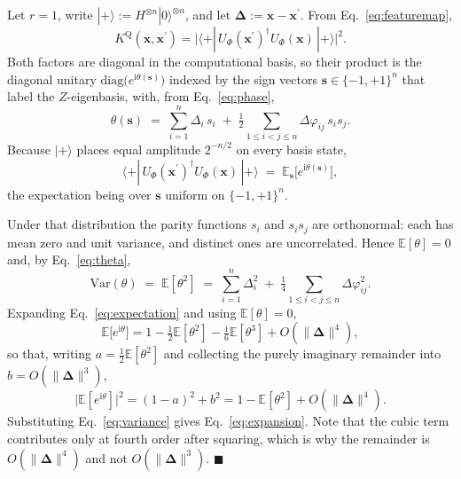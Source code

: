 \begin{revbody}
\label{app:lemma}

Let $r=1$, write $|+\rangle := H^{\otimes n}|0\rangle^{\otimes n}$, and let
$\bm{\Delta} := \bm{x}-\bm{x}^{\prime}$. From Eq.~\eqref{eq:featuremap},
\begin{equation*}
  K^{\mathrm{Q}}(\bm{x},\bm{x}^{\prime})
  = \bigl|\langle +|\,U_{\Phi}(\bm{x}^{\prime})^{\dagger}U_{\Phi}(\bm{x})\,
    |+\rangle\bigr|^{2}.
\end{equation*}
Both factors are diagonal in the computational basis, so their product is the
diagonal unitary $\mathrm{diag}\bigl(e^{\mathrm{i}\theta(\bm{s})}\bigr)$ indexed
by the sign vectors $\bm{s}\in\{-1,+1\}^{n}$ that label the $Z$-eigenbasis, with,
from Eq.~\eqref{eq:phase},
\begin{equation}
\label{eq:theta}
  \theta(\bm{s}) \;=\; \sum_{i=1}^{n}\Delta_i\,s_i
  \;+\; \tfrac{1}{2}\!\!\sum_{1\le i<j\le n}\!\!\Delta\varphi_{ij}\,s_is_j .
\end{equation}
Because $|+\rangle$ places equal amplitude $2^{-n/2}$ on every basis state,
\begin{equation}
\label{eq:expectation}
  \langle +|\,U_{\Phi}(\bm{x}^{\prime})^{\dagger}U_{\Phi}(\bm{x})\,|+\rangle
  \;=\; \mathbb{E}_{\bm{s}}\bigl[e^{\mathrm{i}\theta(\bm{s})}\bigr],
\end{equation}
the expectation being over $\bm{s}$ uniform on $\{-1,+1\}^{n}$.

Under that distribution the parity functions $s_i$ and $s_is_j$ are orthonormal:
each has mean zero and unit variance, and distinct ones are uncorrelated. Hence
$\mathbb{E}[\theta]=0$ and, by Eq.~\eqref{eq:theta},
\begin{equation}
\label{eq:variance}
  \mathrm{Var}(\theta) \;=\; \mathbb{E}[\theta^{2}]
  \;=\; \sum_{i=1}^{n}\Delta_i^{2}
  \;+\; \tfrac{1}{4}\!\!\sum_{1\le i<j\le n}\!\!\Delta\varphi_{ij}^{2}.
\end{equation}
Expanding Eq.~\eqref{eq:expectation} and using $\mathbb{E}[\theta]=0$,
\begin{equation*}
  \mathbb{E}\bigl[e^{\mathrm{i}\theta}\bigr]
  = 1 - \tfrac{1}{2}\mathbb{E}[\theta^{2}]
    - \tfrac{\mathrm{i}}{6}\mathbb{E}[\theta^{3}] + O(\|\bm{\Delta}\|^{4}),
\end{equation*}
so that, writing $a=\tfrac{1}{2}\mathbb{E}[\theta^{2}]$ and collecting the purely
imaginary remainder into $b=O(\|\bm{\Delta}\|^{3})$,
\begin{equation*}
  \bigl|\mathbb{E}[e^{\mathrm{i}\theta}]\bigr|^{2}
  = (1-a)^{2}+b^{2}
  = 1 - \mathbb{E}[\theta^{2}] + O(\|\bm{\Delta}\|^{4}).
\end{equation*}
Substituting Eq.~\eqref{eq:variance} gives Eq.~\eqref{eq:expansion}. Note that
the cubic term contributes only at fourth order after squaring, which is why the
remainder is $O(\|\bm{\Delta}\|^{4})$ and not $O(\|\bm{\Delta}\|^{3})$.
\hfill$\blacksquare$


\end{revbody}
